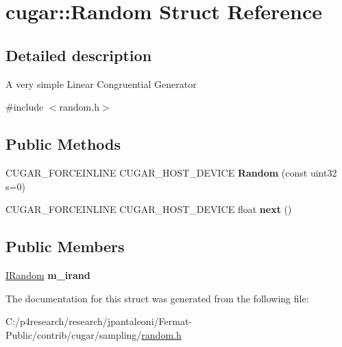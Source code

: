 \hypertarget{structcugar_1_1_random}{}\section{cugar\+:\+:Random Struct Reference}
\label{structcugar_1_1_random}


\subsection{Detailed description}
A very simple Linear Congruential Generator 

{\ttfamily \#include $<$random.\+h$>$}

\subsection*{Public Methods}
\begin{DoxyCompactItemize}
\item 
\mbox{\label{structcugar_1_1_random_ad7ea0d0a3210c195f182fdc9bf52f411}} 
C\+U\+G\+A\+R\+\_\+\+F\+O\+R\+C\+E\+I\+N\+L\+I\+NE C\+U\+G\+A\+R\+\_\+\+H\+O\+S\+T\+\_\+\+D\+E\+V\+I\+CE {\bfseries Random} (const uint32 s=0)
\item 
\mbox{\label{structcugar_1_1_random_ab80343ad28960e0390728105f8e091cc}} 
C\+U\+G\+A\+R\+\_\+\+F\+O\+R\+C\+E\+I\+N\+L\+I\+NE C\+U\+G\+A\+R\+\_\+\+H\+O\+S\+T\+\_\+\+D\+E\+V\+I\+CE float {\bfseries next} ()
\end{DoxyCompactItemize}
\subsection*{Public Members}
\begin{DoxyCompactItemize}
\item 
\mbox{\label{structcugar_1_1_random_a878d34025e5f10922ef29dbf0abb1a0d}} 
\hyperlink{structcugar_1_1_i_random}{I\+Random} {\bfseries m\+\_\+irand}
\end{DoxyCompactItemize}


The documentation for this struct was generated from the following file\+:\begin{DoxyCompactItemize}
\item 
C\+:/p4research/research/jpantaleoni/\+Fermat-\/\+Public/contrib/cugar/sampling/\hyperlink{random_8h}{random.\+h}\end{DoxyCompactItemize}
